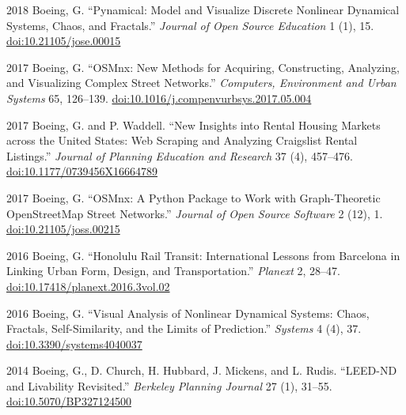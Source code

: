 \documentclass[12pt,letterpaper]{report}
\begin{document}
\begin{tablist}
        \item[2018] \tab Boeing, G. \enquote{Pynamical: Model and Visualize Discrete Nonlinear Dynamical Systems, Chaos, and Fractals.} \textit{Journal of Open Source Education} 1 (1), 15. \href{https://doi.org/10.21105/jose.00015}{doi:10.21105/jose.00015}

        \item[2017] \tab Boeing, G. \enquote{OSMnx: New Methods for Acquiring, Constructing, Analyzing, and Visualizing Complex Street Networks.} \textit{Computers, Environment and Urban Systems} 65, 126--139. \href{https://doi.org/10.1016/j.compenvurbsys.2017.05.004}{doi:10.1016/j.compenvurbsys.2017.05.004}

        \item[2017] \tab Boeing, G. and P. Waddell. \enquote{New Insights into Rental Housing Markets across the United States: Web Scraping and Analyzing Craigslist Rental Listings.} \textit{Journal of Planning Education and Research} 37 (4), 457--476. \href{https://doi.org/10.1177/0739456X16664789}{doi:10.1177/0739456X16664789}

        \item[2017] \tab Boeing, G. \enquote{OSMnx: A Python Package to Work with Graph-Theoretic OpenStreetMap Street Networks.} \textit{Journal of Open Source Software} 2 (12), 1. \href{https://doi.org/10.21105/joss.00215}{doi:10.21105/joss.00215}

        \item[2016] \tab Boeing, G. \enquote{Honolulu Rail Transit: International Lessons from Barcelona in Linking Urban Form, Design, and Transportation.} \textit{Planext} 2, 28--47. \href{https://doi.org/10.17418/planext.2016.3vol.02}{doi:10.17418/planext.2016.3vol.02}

        \item[2016] \tab Boeing, G. \enquote{Visual Analysis of Nonlinear Dynamical Systems: Chaos, Fractals, Self-Similarity, and the Limits of Prediction.} \textit{Systems} 4 (4), 37. \href{https://doi.org/10.3390/systems4040037}{doi:10.3390/systems4040037}

        \item[2014] \tab Boeing, G., D. Church, H. Hubbard, J. Mickens, and L. Rudis. \enquote{LEED-ND and Livability Revisited.} \textit{Berkeley Planning Journal} 27 (1), 31--55. \href{https://doi.org/10.5070/BP327124500}{doi:10.5070/BP327124500}

    \end{tablist}
\end{document}
